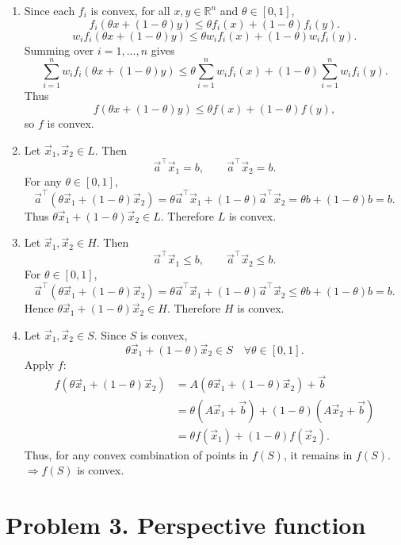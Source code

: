 \documentclass[
  12pt,
]{fphw}
\begin{document}
\begin{enumerate}
\item[(a)] Since each $f_i$ is convex, for all $x,y \in \mathbb{R}^n$ and $\theta \in [0,1]$,
\[
f_i(\theta x + (1-\theta)y)
\le
\theta f_i(x) + (1-\theta) f_i(y).
\]
\[
w_i f_i(\theta x + (1-\theta)y)
\le
\theta w_i f_i(x) + (1-\theta) w_i f_i(y).
\]
Summing over $i=1,\dots,n$ gives
\[
\sum_{i=1}^n w_i f_i(\theta x + (1-\theta)y)
\le
\theta \sum_{i=1}^n w_i f_i(x)
+
(1-\theta) \sum_{i=1}^n w_i f_i(y).
\]
Thus
\[
f(\theta x + (1-\theta)y)
\le
\theta f(x) + (1-\theta) f(y),
\]
so $f$ is convex.

\item[(b)] Let $\vec{x}_1, \vec{x}_2 \in L$. Then
\[
\vec{a}^\top \vec{x}_1 = b,
\qquad
\vec{a}^\top \vec{x}_2 = b.
\]
For any $\theta \in [0,1]$,
\[
\vec{a}^\top(\theta \vec{x}_1 + (1-\theta)\vec{x}_2)
=
\theta \vec{a}^\top \vec{x}_1
+
(1-\theta)\vec{a}^\top \vec{x}_2
=
\theta b + (1-\theta)b
=
b.
\]
Thus $\theta \vec{x}_1 + (1-\theta)\vec{x}_2 \in L$.
Therefore $L$ is convex.

\item[(c)] Let $\vec{x}_1, \vec{x}_2 \in H$. Then
\[
\vec{a}^\top \vec{x}_1 \le b,
\qquad
\vec{a}^\top \vec{x}_2 \le b.
\]
For $\theta \in [0,1]$,
\[
\vec{a}^\top(\theta \vec{x}_1 + (1-\theta)\vec{x}_2)
=
\theta \vec{a}^\top \vec{x}_1
+
(1-\theta)\vec{a}^\top \vec{x}_2
\le
\theta b + (1-\theta)b
=
b.
\]
Hence $\theta \vec{x}_1 + (1-\theta)\vec{x}_2 \in H$.
Therefore $H$ is convex.

\item[(d)] Let $\vec{x}_1, \vec{x}_2 \in S$.
Since $S$ is convex,
\[
\theta \vec{x}_1 + (1-\theta)\vec{x}_2 \in S
\quad \forall \theta \in [0,1].
\]
Apply $f$:
\begin{align*}
f(\theta \vec{x}_1 + (1-\theta)\vec{x}_2) & = A(\theta \vec{x}_1 + (1-\theta)\vec{x}_2) + \vec{b} \\
 & = \theta (A\vec{x}_1 + \vec{b}) + (1-\theta)(A\vec{x}_2 + \vec{b}) \\
 & = \theta f(\vec{x}_1) + (1-\theta) f(\vec{x}_2).
 \end{align*}
Thus,  for any convex combination of points in $f(S)$, it remains in $f(S)$.
\\$\Rightarrow f(S)$ is convex.
\end{enumerate}


\newpage
\section*{Problem 3. Perspective function}
\end{document}
